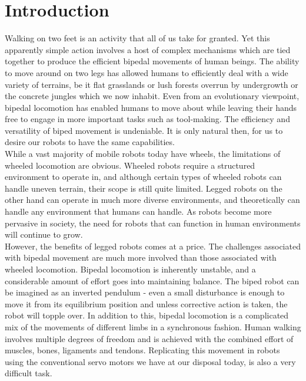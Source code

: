 \documentclass[12pt,twoside]{article}
\theoremstyle{plain}
\theoremstyle{definition}
\theoremstyle{remark}
\newcommand{\forceindent}{\leavevmode{\parindent=2em\indent}}
\begin{document}
\section{Introduction}
\label{sec:introduction}
\forceindent Walking on two feet is an activity that all of us take for granted. Yet this apparently simple action involves a host of complex mechanisms which are tied together to produce the efficient bipedal movements of human beings. The ability to move around on two legs has allowed humans to efficiently deal with a wide variety of terrains, be it flat grasslands or lush forests overrun by undergrowth or the concrete jungles which we now inhabit. Even from an evolutionary viewpoint, bipedal locomotion has enabled humans to move about while leaving their hands free to engage in more important tasks such as tool-making. The efficiency and versatility of biped movement is undeniable. It is only natural then, for us to desire our robots to have the same capabilities.\\ 
\forceindent While a vast majority of mobile robots today have wheels, the limitations of wheeled locomotion are obvious. Wheeled robots require a structured environment to operate in, and although certain types of wheeled robots can handle uneven terrain, their scope is still quite limited. Legged robots on the other hand can operate in much more diverse environments, and theoretically can handle any environment that humans can handle. As robots become more pervasive in society, the need for robots that can function in human environments will continue to grow.\\
\forceindent However, the benefits of legged robots comes at a price. The challenges associated with bipedal movement are much more involved than those associated with wheeled locomotion. Bipedal locomotion is inherently unstable, and a considerable amount of effort goes into maintaining balance. The biped robot can be imagined as an inverted pendulum - even a small disturbance is enough to move it from its equilibrium position and unless corrective action is taken, the robot will topple over. In addition to this, bipedal locomotion is a complicated mix of the movements of different limbs in a synchronous fashion. Human walking involves multiple degrees of freedom and is achieved with the combined effort of muscles, bones, ligaments and tendons. Replicating this movement in robots using the conventional servo motors we have at our disposal today, is also a very difficult task.\\
\end{document}
